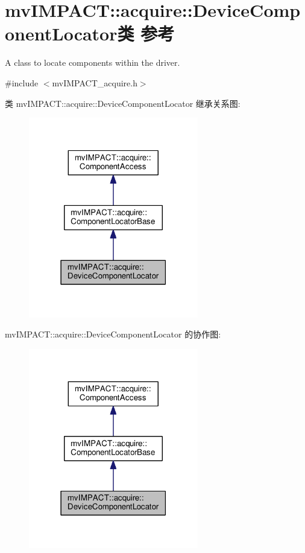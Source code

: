 \hypertarget{classmv_i_m_p_a_c_t_1_1acquire_1_1_device_component_locator}{\section{mv\+I\+M\+P\+A\+C\+T\+:\+:acquire\+:\+:Device\+Component\+Locator类 参考}
\label{classmv_i_m_p_a_c_t_1_1acquire_1_1_device_component_locator}
}


A class to locate components within the driver.  




{\ttfamily \#include $<$mv\+I\+M\+P\+A\+C\+T\+\_\+acquire.\+h$>$}



类 mv\+I\+M\+P\+A\+C\+T\+:\+:acquire\+:\+:Device\+Component\+Locator 继承关系图\+:
\nopagebreak
\begin{figure}[H]
\begin{center}
\leavevmode
\includegraphics[width=210pt]{classmv_i_m_p_a_c_t_1_1acquire_1_1_device_component_locator__inherit__graph}
\end{center}
\end{figure}


mv\+I\+M\+P\+A\+C\+T\+:\+:acquire\+:\+:Device\+Component\+Locator 的协作图\+:
\nopagebreak
\begin{figure}[H]
\begin{center}
\leavevmode
\includegraphics[width=210pt]{classmv_i_m_p_a_c_t_1_1acquire_1_1_device_component_locator__coll__graph}
\end{center}
\end{figure}
